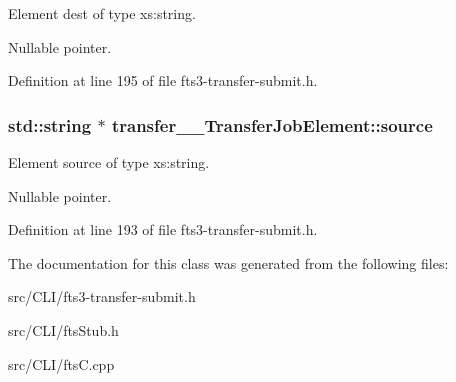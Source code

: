 Element dest of type xs:string. 

Nullable pointer. 

Definition at line 195 of file fts3-\/transfer-\/submit.h.

\subsubsection[{source}]{\setlength{\rightskip}{0pt plus 5cm}std::string $\ast$ {\bf transfer\_\-\_\-TransferJobElement::source}}\label{classtransfer____TransferJobElement_a705f3b30aa519c3f9f7ceca37c9120c0}


Element source of type xs:string. 

Nullable pointer. 

Definition at line 193 of file fts3-\/transfer-\/submit.h.



The documentation for this class was generated from the following files:\begin{DoxyCompactItemize}
\item 
src/CLI/fts3-\/transfer-\/submit.h\item 
src/CLI/ftsStub.h\item 
src/CLI/ftsC.cpp\end{DoxyCompactItemize}
